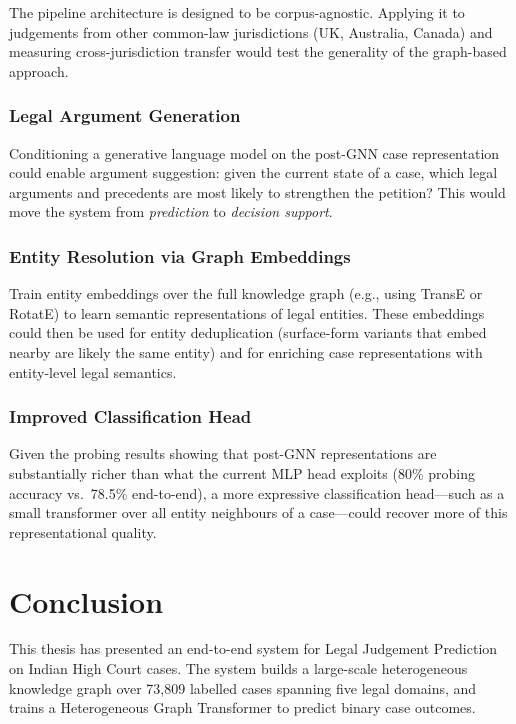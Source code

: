 \documentclass[12pt,a4paper]{report}
\begin{document}
The pipeline architecture is designed to be corpus-agnostic. Applying it to judgements from other common-law jurisdictions (UK, Australia, Canada) and measuring cross-jurisdiction transfer would test the generality of the graph-based approach.

\subsection{Legal Argument Generation}

Conditioning a generative language model on the post-GNN case representation could enable argument suggestion: given the current state of a case, which legal arguments and precedents are most likely to strengthen the petition? This would move the system from \textit{prediction} to \textit{decision support}.

\subsection{Entity Resolution via Graph Embeddings}

Train entity embeddings over the full knowledge graph (e.g., using TransE or RotatE) to learn semantic representations of legal entities. These embeddings could then be used for entity deduplication (surface-form variants that embed nearby are likely the same entity) and for enriching case representations with entity-level legal semantics.

\subsection{Improved Classification Head}

Given the probing results showing that post-GNN representations are substantially richer than what the current MLP head exploits (80\% probing accuracy vs.\ 78.5\% end-to-end), a more expressive classification head---such as a small transformer over all entity neighbours of a case---could recover more of this representational quality.

\chapter{Conclusion}
\label{chap:conclusion}

This thesis has presented an end-to-end system for Legal Judgement Prediction on Indian High Court cases. The system builds a large-scale heterogeneous knowledge graph over 73,809 labelled cases spanning five legal domains, and trains a Heterogeneous Graph Transformer to predict binary case outcomes.
\end{document}
